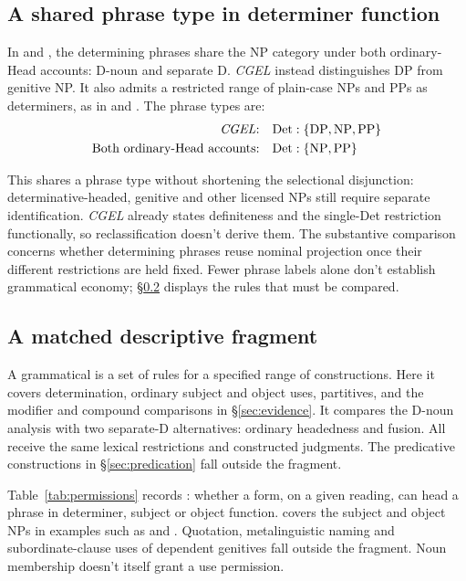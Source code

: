\documentclass[12pt]{article}
\begin{document}
\subsection{A shared phrase type in determiner function}\label{sec:det-uniform}

In  and , the determining phrases share the NP category under both ordinary-Head accounts: D-noun and separate D. \textit{CGEL} instead distinguishes DP from genitive NP. It also admits a restricted range of plain-case NPs and PPs as determiners, as in  and  \citep[Ch.~5, §4]{huddleston2002}. The phrase types are:
\[
\begin{aligned}
\text{\textit{CGEL}:} &\quad \mathrm{Det}:\{\mathrm{DP},\mathrm{NP},\mathrm{PP}\} \\
\text{Both ordinary-Head accounts:} &\quad \mathrm{Det}:\{\mathrm{NP},\mathrm{PP}\}
\end{aligned}
\]

This shares a phrase type without shortening the selectional disjunction: determinative-headed, genitive and other licensed NPs still require separate identification. \textit{CGEL} already states definiteness and the single-Det restriction functionally, so reclassification doesn't derive them. The substantive comparison concerns whether determining phrases reuse nominal projection once their different restrictions are held fixed. Fewer phrase labels alone don't establish grammatical economy; §\ref{sec:fragment} displays the rules that must be compared.

\subsection{A matched descriptive fragment}\label{sec:fragment}

A grammatical  is a set of rules for a specified range of constructions. Here it covers determination, ordinary subject and object uses, partitives, and the modifier and compound comparisons in §\ref{sec:evidence}. It compares the D-noun analysis with two separate-D alternatives: ordinary headedness and fusion. All receive the same lexical restrictions and constructed judgments. The predicative constructions in §\ref{sec:predication} fall outside the fragment.

Table~\ref{tab:permissions} records : whether a form, on a given reading, can head a phrase in determiner, subject or object function.  covers the subject and object NPs in examples such as  and . Quotation, metalinguistic naming and subordinate-clause uses of dependent genitives fall outside the fragment. Noun membership doesn't itself grant a use permission.
\end{document}
